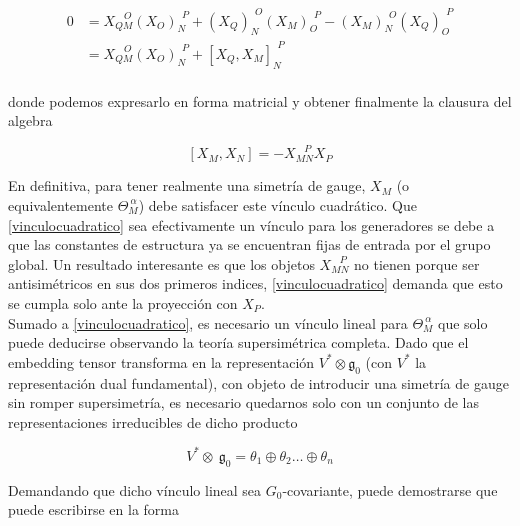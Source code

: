 \documentclass{article}
\numberwithin{equation}{section}
\begin{document}
\begin{equation}\label{embedding2}
\begin{aligned}
0 &= X_{Q M}^{\ \ \ \ O} \left(X_O\right)_N^{ \ \ P} + \left(X_Q\right)_N^{\ \ O} \left( X_M\right)_O^{\ \ P} - \left(X_M\right)_N^{\ \ O} \left(X_Q\right)_O^{\ \ P} \\
&= X_{Q M}^{\ \ \ \ O} \left(X_O\right)_N^{ \ \ P} + \left[X_Q,X_M\right]_N^{\ \ P} \\
\end{aligned}
\end{equation}

donde podemos expresarlo en forma matricial y obtener finalmente la clausura del algebra\\

\begin{boxquation}
	\begin{equation}\label{vinculocuadratico}
	\left[X_M, X_N\right] = - X_{M N}^{\ \ \ \ P} X_P
	\end{equation}
\end{boxquation}


En definitiva, para tener realmente una simetría de gauge, $ X_M $ (o equivalentemente $ \Theta_M^{\ \alpha} $) debe satisfacer este vínculo cuadrático. Que \ref{vinculocuadratico} sea efectivamente un vínculo para los generadores se debe a que las constantes de estructura ya se encuentran fijas de entrada por el grupo global. Un resultado interesante es que los objetos $ X_{M N}^{\ \ \ \ P} $ no tienen porque ser antisimétricos en sus dos primeros indices, \ref{vinculocuadratico} demanda que esto se cumpla solo ante la proyección con $ X_P $.\\

Sumado a \ref{vinculocuadratico}, es necesario un vínculo lineal para $ \Theta_M^{\ \alpha} $ que solo puede deducirse observando la teoría supersimétrica completa. Dado que el embedding tensor transforma en la representación $ V^{*} \otimes \mathfrak{g}_0 $  (con $ V^{*} $ la representación dual fundamental), con objeto de introducir una simetría de gauge sin romper supersimetría, es necesario quedarnos solo con un conjunto de las representaciones irreducibles de dicho producto

\begin{equation}
V^{*} \otimes \ \mathfrak{g}_0 = \theta_1 \oplus \theta_2 \dots \oplus \theta_n
\end{equation}

Demandando que dicho vínculo lineal sea $G_0$-covariante, puede demostrarse que puede escribirse en la forma
\end{document}
